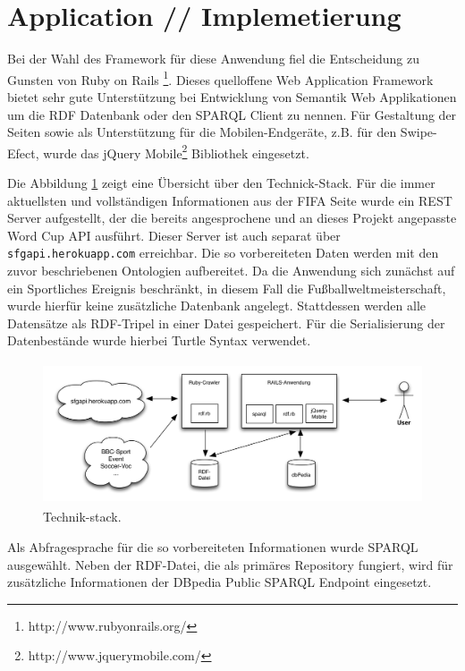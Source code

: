 \documentclass[runningheads,a4paper]{llncs}
\begin{document}
\section{Application // Implemetierung}


Bei der Wahl des Framework für diese Anwendung fiel die Entscheidung zu Gunsten von Ruby on Rails \footnote{http://www.rubyonrails.org/}. Dieses quelloffene Web Application Framework bietet sehr gute Unterstützung bei Entwicklung von Semantik Web Applikationen um die RDF Datenbank oder den SPARQL Client zu nennen. Für Gestaltung der Seiten sowie als Unterstützung für die Mobilen-Endgeräte, z.B. für den Swipe-Efect, wurde das jQuery Mobile\footnote{http://www.jquerymobile.com/} Bibliothek eingesetzt. 

Die Abbildung \ref{fig:example} zeigt eine Übersicht über den Technick-Stack. Für die immer aktuellsten und vollständigen Informationen aus der FIFA Seite wurde ein REST Server aufgestellt, der die bereits angesprochene und an dieses Projekt angepasste Word Cup API ausführt. Dieser Server ist auch separat über \texttt{sfgapi.herokuapp.com} erreichbar. Die so vorbereiteten Daten werden mit den zuvor beschriebenen Ontologien aufbereitet. Da die Anwendung sich zunächst auf ein Sportliches Ereignis beschränkt, in diesem Fall die Fußballweltmeisterschaft, wurde hierfür keine zusätzliche Datenbank angelegt. Stattdessen werden alle Datensätze als RDF-Tripel in einer Datei gespeichert. Für die Serialisierung der Datenbestände wurde hierbei Turtle Syntax verwendet.
\begin{figure}
\centering
\includegraphics[height=4.2cm]{technik-stack}
\caption{Technik-stack.}
\label{fig:example}
\end{figure}


Als Abfragesprache für die so vorbereiteten Informationen wurde SPARQL ausgewählt. Neben der RDF-Datei, die als primäres Repository fungiert, wird für zusätzliche Informationen der DBpedia Public SPARQL Endpoint eingesetzt. 
\end{document}
